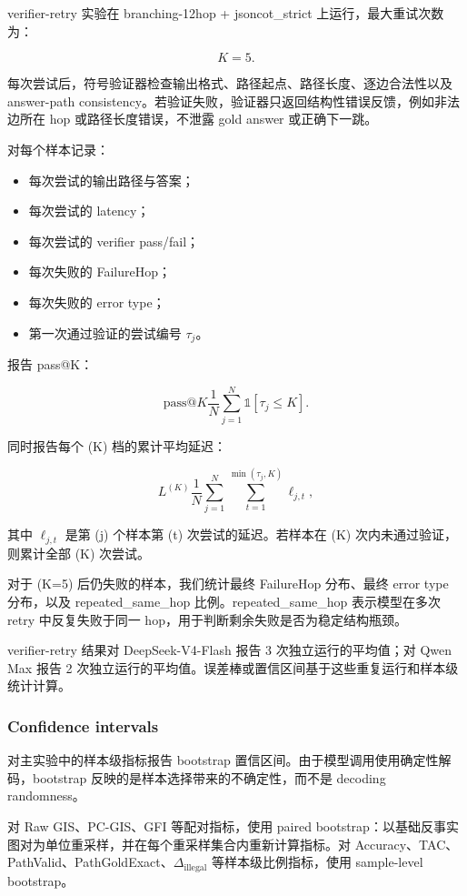 \documentclass[
  11pt,
]{article}
\begin{document}
verifier-retry 实验在 branching-12hop + jsoncot\_strict
上运行，最大重试次数为：

\[
K=5.  
\]

每次尝试后，符号验证器检查输出格式、路径起点、路径长度、逐边合法性以及
answer-path
consistency。若验证失败，验证器只返回结构性错误反馈，例如非法边所在 hop
或路径长度错误，不泄露 gold answer 或正确下一跳。

对每个样本记录：

\begin{itemize}
\item
  每次尝试的输出路径与答案；
\item
  每次尝试的 latency；
\item
  每次尝试的 verifier pass/fail；
\item
  每次失败的 FailureHop；
\item
  每次失败的 error type；
\item
  第一次通过验证的尝试编号 \(\tau_j\)。
\end{itemize}

报告 pass@K：

\[
\mathrm{pass@}K
\frac{1}{N}  
\sum_{j=1}^{N}  
\mathbb{1}[\tau_j\le K].  
\]

同时报告每个 (K) 档的累计平均延迟：

\[
L^{(K)}
\frac{1}{N}  
\sum_{j=1}^{N}  
\sum_{t=1}^{\min(\tau_j,K)}  
\ell_{j,t},  
\]

其中 \(\ell_{j,t}\) 是第 (j) 个样本第 (t) 次尝试的延迟。若样本在 (K)
次内未通过验证，则累计全部 (K) 次尝试。

对于 (K=5) 后仍失败的样本，我们统计最终 FailureHop 分布、最终 error type
分布，以及 repeated\_same\_hop 比例。repeated\_same\_hop 表示模型在多次
retry 中反复失败于同一 hop，用于判断剩余失败是否为稳定结构瓶颈。

verifier-retry 结果对 DeepSeek-V4-Flash 报告 3 次独立运行的平均值；对
Qwen Max 报告 2
次独立运行的平均值。误差棒或置信区间基于这些重复运行和样本级统计计算。

\subsubsection{Confidence intervals}\label{confidence-intervals}

对主实验中的样本级指标报告 bootstrap
置信区间。由于模型调用使用确定性解码，bootstrap
反映的是样本选择带来的不确定性，而不是 decoding randomness。

对 Raw GIS、PC-GIS、GFI 等配对指标，使用 paired
bootstrap：以基础反事实图对为单位重采样，并在每个重采样集合内重新计算指标。对
Accuracy、TAC、PathValid、PathGoldExact、\(\Delta_{\text{illegal}}\)
等样本级比例指标，使用 sample-level bootstrap。
\end{document}
